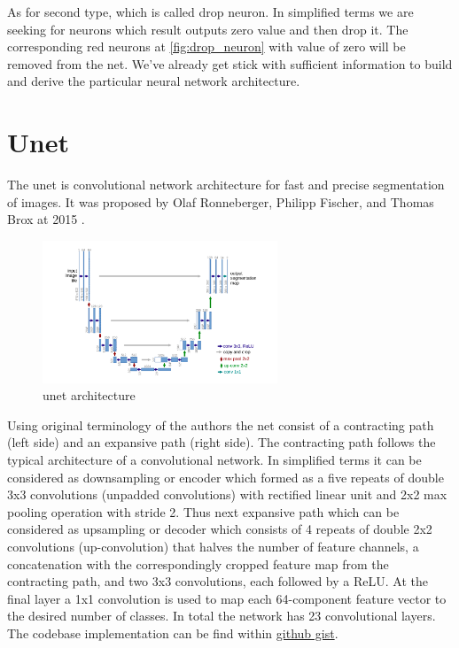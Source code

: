 As for second type, which is called drop neuron. In simplified terms we are seeking for neurons which result outputs zero value and then drop it. The corresponding red neurons at \ref{fig:drop_neuron} with value of zero will be removed from the net. We've already get stick with sufficient information to build and derive the particular neural network architecture. 

\section{Unet}
The unet is convolutional network architecture for fast and precise segmentation of images. It was proposed by Olaf Ronneberger, Philipp Fischer, and Thomas Brox at 2015 \cite{Ronneberger2015}. 
\begin{figure}[h]
    \centering \includegraphics[width=7cm]{images/unet.png}
    \caption {unet architecture}
\end{figure}

Using original terminology of the authors the net consist of a contracting path (left side) and an expansive path (right side). The contracting path follows the typical architecture of a convolutional network. In simplified terms it can be considered as downsampling or encoder which formed as
a five repeats of double 3x3 convolutions (unpadded convolutions) with rectified linear unit and 2x2 max pooling operation with stride 2. Thus next expansive path which can be considered as upsampling or decoder which consists of 4 repeats of double 2x2 convolutions (up-convolution) that halves the number of feature channels, a concatenation with the correspondingly cropped feature map from the contracting path, and two 3x3 convolutions, each followed by a ReLU. At the final layer a 1x1 convolution is used to map each 64-component feature vector to the desired number of classes. In total the network has 23 convolutional layers. The codebase implementation can be find within \href{https://gist.github.com/f8eb74d57b914878d52c47ac359758e8.git}{\color{blue} github gist}.






